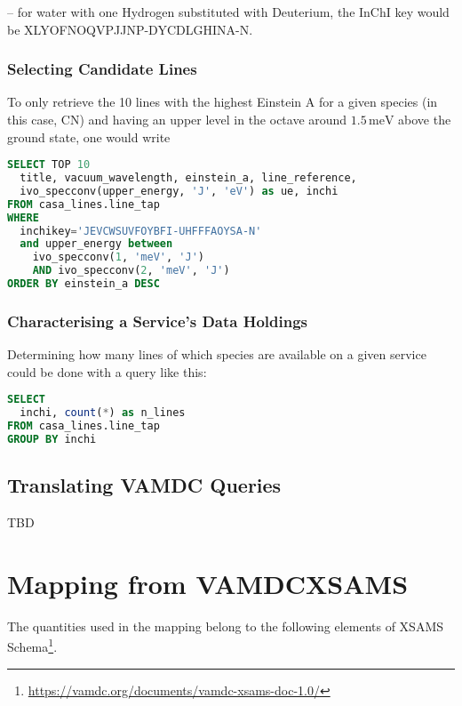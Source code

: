 \documentclass[11pt,a4paper]{ivoa}
\begin{document}
\noindent -- for water with one Hydrogen substituted 
with Deuterium, the InChI key
would be XLYOFNOQVPJJNP-DYCDLGHINA-N.

\subsubsection{Selecting Candidate Lines}

To only retrieve the 10 lines with the highest Einstein A for a given
species (in this case, CN) and having an upper level in the octave
around
$1.5\,\textrm{meV}$ above the ground state, one would write

\begin{lstlisting}[language=SQL]
SELECT TOP 10
  title, vacuum_wavelength, einstein_a, line_reference,
  ivo_specconv(upper_energy, 'J', 'eV') as ue, inchi
FROM casa_lines.line_tap
WHERE
  inchikey='JEVCWSUVFOYBFI-UHFFFAOYSA-N'
  and upper_energy between
    ivo_specconv(1, 'meV', 'J')
    AND ivo_specconv(2, 'meV', 'J')
ORDER BY einstein_a DESC
\end{lstlisting}


\subsubsection{Characterising a Service's Data Holdings}

Determining how many lines of which species are available on a given
service could be done with a query like this:

\begin{lstlisting}[language=SQL]
SELECT 
  inchi, count(*) as n_lines
FROM casa_lines.line_tap
GROUP BY inchi
\end{lstlisting}


\subsection{Translating VAMDC Queries}
TBD


\section{Mapping from VAMDCXSAMS}
\label{sect:mapping}

The quantities used in the mapping belong to the following elements of XSAMS 
Schema\footnote{\url{https://vamdc.org/documents/vamdc-xsams-doc-1.0/}\label{fn:schema}}.
\end{document}
